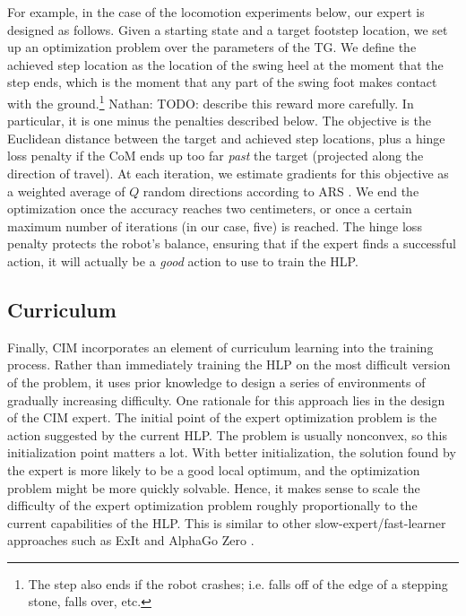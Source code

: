 \documentclass[a4paper]{article}
\newcommand{\nhatch}[1]{{\leavevmode\color{magenta} Nathan: #1}}
\begin{document}
For example, in the case of the locomotion experiments below, our expert is designed as follows.
Given a starting state and a target footstep location, we set up an optimization problem
over the parameters of the TG.
We define the achieved step location as the location of the swing heel at the moment that the step ends, which is the moment that any part of the swing foot makes contact with the ground.\footnote{The step also ends if the robot crashes; i.e. falls off of the edge of a stepping stone, falls over, etc.}
\nhatch{TODO: describe this reward more carefully. In particular, it is one minus the penalties described below.}
The objective is the Euclidean distance between the target and achieved step locations,
plus a hinge loss penalty if the CoM ends up too far \emph{past} the target (projected along the direction of travel).
At each iteration, we estimate gradients for this objective as a weighted average of $Q$ random directions according to ARS \citep{mania2018simple}.
We end the optimization once the accuracy reaches two centimeters, or once a certain maximum number of iterations (in our case, five) is reached.
The hinge loss penalty protects the robot's balance, ensuring that if the expert finds a successful action, it will actually be a \emph{good} action to use to train the HLP.


\subsection{Curriculum} \label{sec:curriculum}

Finally, CIM incorporates an element of curriculum learning into the training process.
Rather than immediately training the HLP on the most difficult version of the problem,
it uses prior knowledge to design a series of environments of gradually increasing difficulty.
One rationale for this approach lies in the design of the CIM expert.
The initial point of the expert optimization problem is the action suggested by the current HLP.
The problem is usually nonconvex, so this initialization point matters a lot.
With better initialization, the solution found by the expert is more likely to be a good local optimum, and the optimization problem might be more quickly solvable.
Hence, it makes sense to scale the difficulty of the expert optimization problem roughly proportionally to the current capabilities of the HLP.
This is similar to other slow-expert/fast-learner approaches such as ExIt \citep{anthony2017thinking} and AlphaGo Zero \citep{silver2017mastering}.
\end{document}

